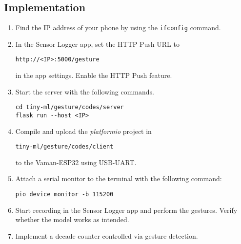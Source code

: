 \subsection{Implementation}
\begin{enumerate}
    \item Find the IP address of your phone by using the \texttt{ifconfig}
    command.
    \item In the Sensor Logger app, set the HTTP Push URL to
    \begin{lstlisting}
http://<IP>:5000/gesture
    \end{lstlisting}
    in the app settings. Enable the HTTP Push feature.
    \item Start the server with the following commands.
    \begin{lstlisting}
cd tiny-ml/gesture/codes/server
flask run --host <IP>
    \end{lstlisting}
    \item Compile and upload the \emph{platformio} project in
    \begin{lstlisting}
tiny-ml/gesture/codes/client
    \end{lstlisting}
    to the Vaman-ESP32 using USB-UART.
    \item Attach a serial monitor to the terminal with the following command:
    \begin{lstlisting}
pio device monitor -b 115200
    \end{lstlisting}
    \item Start recording in the Sensor Logger app and perform the gestures.
    Verify whether the model works as intended.
    \item Implement a decade counter controlled via gesture detection.
\end{enumerate}
